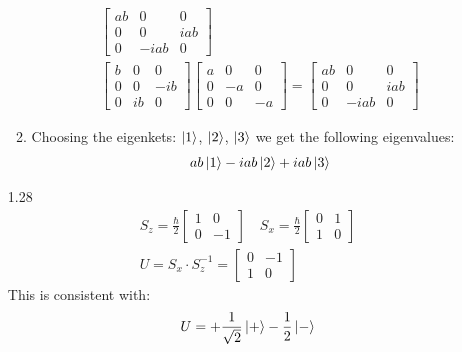 \documentclass[12pt]{article}
\begin{document}
\begin{enumerate}
\begin{enumerate}
\begin{gather}
\begin{bmatrix}
                    ab & 0    & 0   \\
                    0  & 0    & iab \\
                    0  & -iab & 0
                \end{bmatrix}\\
                \begin{bmatrix}
                    b & 0  & 0   \\
                    0 & 0  & -ib \\
                    0 & ib & 0
                \end{bmatrix}
                \begin{bmatrix}
                    a & 0  & 0  \\
                    0 & -a & 0  \\
                    0 & 0  & -a
                \end{bmatrix}=
                \begin{bmatrix}
                    ab & 0    & 0   \\
                    0  & 0    & iab \\
                    0  & -iab & 0
                \end{bmatrix}
            \end{gather}
            \item
            Choosing the eigenkets: $\ket{1}$, $\ket{2}$, $\ket{3}$ we get the following eigenvalues:
            \begin{gather}
                ab\ket{1}-iab\ket{2}+iab\ket{3}
            \end{gather}
        \end{enumerate}
        \item[1.28]
        \begin{gather}
            S_z=\frac{\hbar}{2}
            \begin{bmatrix}
                1 & 0  \\
                0 & -1
            \end{bmatrix}\quad
            S_x=\frac{\hbar}{2}
            \begin{bmatrix}
                0 & 1 \\
                1 & 0
            \end{bmatrix}\\
            U=S_x\cdot S_z^{-1}=
            \begin{bmatrix}
                0 & -1 \\
                1 & 0
            \end{bmatrix}
        \end{gather}
        This is consistent with:
        \begin{gather}
            U=+\frac{1}{\sqrt{2}}\ket{+}-\frac{1}{2}\ket{-}
        \end{gather}
    \end{enumerate}
\end{document}

